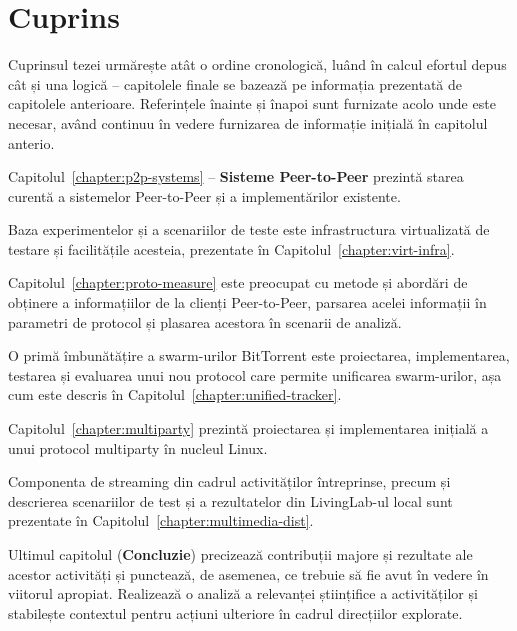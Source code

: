 \section{Cuprins}
\label{sec:intro:contents}

Cuprinsul tezei urmărește atât o ordine cronologică, luând în calcul efortul
depus cât și una logică -- capitolele finale se bazează pe informația
prezentată de capitolele anterioare. Referințele înainte și înapoi sunt
furnizate acolo unde este necesar, având continuu în vedere furnizarea de
informație inițială în capitolul anterio.

Capitolul~\ref{chapter:p2p-systems} -- \textbf{Sisteme Peer-to-Peer} prezintă
starea curentă a sistemelor Peer-to-Peer și a implementărilor existente.

Baza experimentelor și a scenariilor de teste este infrastructura virtualizată
de testare și facilitățile acesteia, prezentate în
Capitolul~\ref{chapter:virt-infra}.

Capitolul~\ref{chapter:proto-measure} este preocupat cu metode și abordări de
obținere a informațiilor de la clienți Peer-to-Peer, parsarea acelei
informații în parametri de protocol și plasarea acestora în scenarii de
analiză.

O primă îmbunătățire a swarm-urilor BitTorrent este proiectarea,
implementarea, testarea și evaluarea unui nou protocol care permite unificarea
swarm-urilor, așa cum este descris în Capitolul~\ref{chapter:unified-tracker}.

Capitolul~\ref{chapter:multiparty} prezintă proiectarea și implementarea
inițială a unui protocol multiparty în nucleul Linux.

Componenta de streaming din cadrul activităților întreprinse, precum și
descrierea scenariilor de test și a rezultatelor din LivingLab-ul local sunt
prezentate în Capitolul~\ref{chapter:multimedia-dist}.

Ultimul capitolul (\textbf{Concluzie}) precizează contribuții majore și
rezultate ale acestor activități și punctează, de asemenea, ce trebuie să fie
avut în vedere în viitorul apropiat. Realizează o analiză a relevanței
științifice a activităților și stabilește contextul pentru acțiuni ulteriore
în cadrul direcțiilor explorate.
